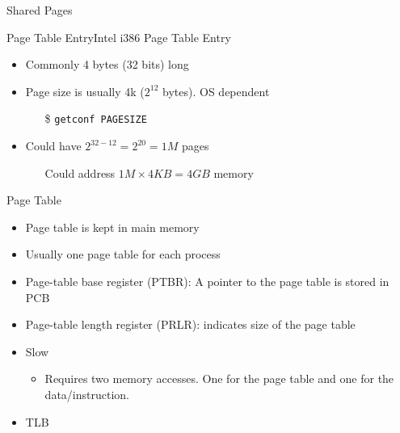 \begin{frame}{Shared Pages}
  \begin{center}
  \end{center}
\end{frame}

\begin{frame}{Page Table Entry}{Intel i386 Page Table Entry}
  \begin{itemize}
  \item Commonly 4 bytes (32 bits) long
  \item Page size is usually 4k ($2^{12}$ bytes). OS dependent
    \begin{itemize}
    \item[\$] \texttt{getconf PAGESIZE}
    \end{itemize}
  \item Could have $2^{32-12}=2^{20}=1M$ pages
    \begin{itemize}
    \item[] Could address $1M\times{}4KB=4GB$ memory
    \end{itemize}
  \end{itemize}
  \begin{center}
  \end{center}
\end{frame}

\begin{frame}{Page Table}
  \begin{itemize}
  \item Page table is kept in main memory
  \item Usually one page table for each process
  \item \alert{Page-table base register (PTBR):} A pointer to the page table is stored in
    PCB
  \item \alert{Page-table length register (PRLR):} indicates size of the page table
  \item Slow
    \begin{itemize}
    \item Requires two memory accesses. One for the page table and one for the
      data/instruction.
    \end{itemize}
  \item TLB
  \end{itemize}
\end{frame}

